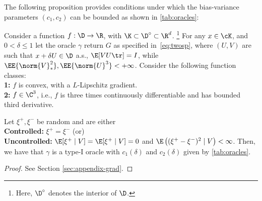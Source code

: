 The following proposition provides conditions under which the bias-variance parameters $(c_1,c_2)$ can be bounded as shown in \cref{tab:oracles}:
\begin{proposition}
\label{prop:grad-spsa}
Consider a function $f:\D \to \R$, with $\K \subset \D^\circ \subset \R^d$.%
\footnote{Here, $\D^\circ$ denotes the interior of $\D$.}
For any $x \in \cK$, and $0< \delta \le 1$ let the oracle $\gamma$ return $G$ as specified in~\eqref{eq:twosp},
where $(U,V)$ are such that $x+\delta U \in \D$ a.s.,
$\E[V U\tr] = I$, while 
$\EE{\norm{V}_*^2}, \EE{ \norm{U}^3 }<+\infty$.
Consider the following function classes:\\ 
\textbf{1:} $f$ is convex, with a $L$-Lipschitz gradient.\\
\textbf{2:} $f \in \C^3$, i.e., $f$ is three times continuously differentiable and has bounded third derivative.

Let $\xi^+, \xi^-$ be  random and are either \\
\textbf{Controlled:} $\xi^+= \xi^-$ (or)  \\
\textbf{Uncontrolled:} $\E[\xi^+ \mid V] = \E[\xi^+ \mid V] =0$ and $\E \left( (\xi^{+} - \xi^-)^{2} \mid V\right) < \infty$.
\fi
Then, we have that $\gamma$ is a type-I oracle with $c_1(\delta)$ and $c_2(\delta)$ given by \cref{tab:oracles}.
\end{proposition}
\begin{proof}
See Section \ref{sec:appendix-grad}.
\end{proof}

